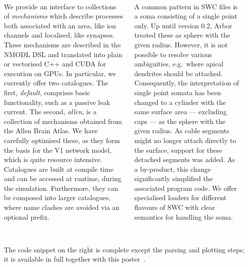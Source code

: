 \documentclass{beamer}
\begin{document}
\begin{frame}[t, fragile]
  \begin{columns}[onlytextwidth,T]
    \begin{column}{.49\linewidth}
      \textbf{}\\
      We provide an interface to collections of \emph{mechanisms} which describe
      processes both associated with an area, like ion channels and
      localised, like synapses. These mechanisms are described in the NMODL DSL
      and translated into plain or vectorised C++ and CUDA for execution on GPUs.
      In particular, we currently offer two catalogues. The first, \emph{default},
      comprises basic functionality, such as a passive leak current.
      The second, \emph{allen}, is a collection of mechanisms
      obtained from the Allen Brain Atlas\cite{mouse-atlas}. We have carefully
      optimised these, as they form the basis for the V1 network model, which is
      quite resource intensive. Catalogues are built at compile time and can be
      accessed at runtime, during the simulation. Furthermore, they can be composed
      into larger catalogues, where name clashes are avoided via an optional prefix.
    \end{column}
    \begin{column}{.49\linewidth}
      \textbf{}\\
      A common pattern in SWC files is a soma consisting of a single point only.
      Up until version 0.2, Arbor treated these as sphere with the given radius.
      However, it is not possible to
      resolve various ambiguities, e.g.\ where apical dendrites should be
      attached. Consequently, the interpretation of single point somata has been
      changed to a cylinder with the same surface area --- excluding caps --- as
      the sphere with the given radius. As cable segments might no longer attach
      directly to the surface, support for these detached segments was added. As
      a by-product, this change significantly simplified the associated program
      code. We offer specialised loaders for different flavours of SWC with
      clear semantics for handling the soma.
    \end{column}\\[2.5ex]
  \end{columns}
  \textbf{{\large{}}}\\
  The code snippet on the right is complete except the parsing and plotting
  steps; it is available in full together with this poster~\cite{my-source}.

\end{frame}
\end{document}
